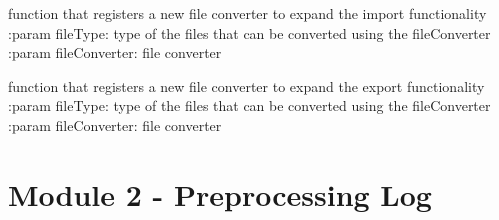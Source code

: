 \documentclass[letterpaper,10pt,english]{sphinxmanual}
\begin{document}
\begin{fulllineitems}
\begin{fulllineitems}
\end{fulllineitems}


\begin{fulllineitems}
\label{\detokenize{eventLogConverter:eventLogConverter.fileUtility.FileUtilityBase.registerImport}}
function that registers a new file converter to expand the import functionality
:param fileType: type of the files that can be converted using the fileConverter
:param fileConverter: file converter

\end{fulllineitems}


\begin{fulllineitems}
\label{\detokenize{eventLogConverter:eventLogConverter.fileUtility.FileUtilityBase.registerExport}}
function that registers a new file converter to expand the export functionality
:param fileType: type of the files that can be converted using the fileConverter
:param fileConverter: file converter

\end{fulllineitems}


\end{fulllineitems}


\begin{DUlineblock}{0em}
\item[] 
\end{DUlineblock}

{\hyperref[\detokenize{index:mastertoc}]{}}


\chapter{Module 2 - Preprocessing Log}
\label{\detokenize{preprocessing:module-2-preprocessing-log}}\label{\detokenize{preprocessing::doc}}
\begin{DUlineblock}{0em}
\item[] 
\end{DUlineblock}
\end{document}
